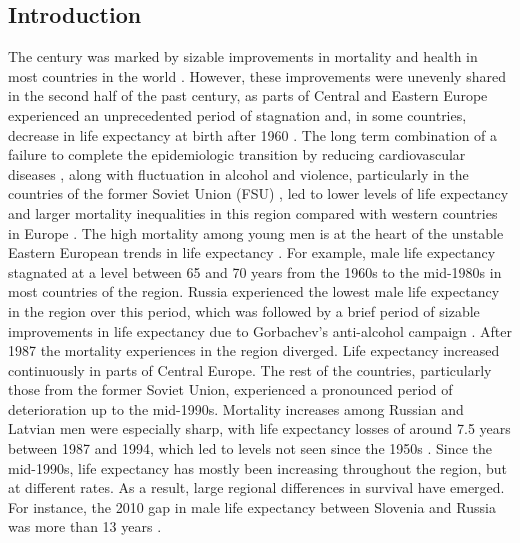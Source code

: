 \documentclass{article}
\begin{document}
\begin{spacing}{1.5}
\section*{Introduction}
The  century was marked by sizable improvements in mortality and health in most countries in the world \citep{who2000}. However, these improvements were unevenly shared in the second half of the past century, as parts of Central and Eastern Europe experienced an unprecedented period of stagnation and, in some countries, decrease in life expectancy at birth after 1960 \citep{HMD}. The long term combination of a failure to complete the epidemiologic transition by reducing cardiovascular diseases \citep{caselli2002epidemiologic}, \textcolor[rgb]{1,0,0}{along with fluctuation in alcohol and violence, particularly in the countries of the former Soviet Union (FSU)} \citep{bye2008alcohol,leon1997huge}, led to lower levels of life expectancy and larger mortality inequalities in this region compared with western countries in Europe \citep{mackenbach2008socioeconomic}. The high mortality among young men is at the heart of \textcolor[rgb]{1,0,0}{the unstable} Eastern European trends in life expectancy \citep{mckee2001}. For example, male life expectancy stagnated at a level between 65 and 70 years from the 1960s to the mid-1980s \textcolor[rgb]{1,0,0}{in most countries of the region}. Russia experienced the lowest male life expectancy \textcolor[rgb]{1,0,0}{in the region over this period, which was followed by} a brief period of sizable improvements in life expectancy due to Gorbachev's anti-alcohol campaign \citep{leon1998social}. After 1987 the mortality experiences in the region diverged. Life expectancy increased continuously in parts of \textcolor[rgb]{1,0,0}{Central Europe}. The rest of the countries, particularly those from the former Soviet Union, experienced a pronounced period of deterioration up to the mid-1990s. Mortality increases among Russian and Latvian men were especially sharp, with life expectancy losses of around 7.5 years between 1987 and 1994, which led to levels not seen since the 1950s \citep{shkolnikov2001}. Since the mid-1990s, life expectancy has mostly been increasing throughout the region, but at different rates. As a result, large regional differences in survival have emerged. For instance, the 2010 gap in male life expectancy between Slovenia and Russia was more than 13 years \citep{HMD}.\\


\end{spacing}
\end{document}

